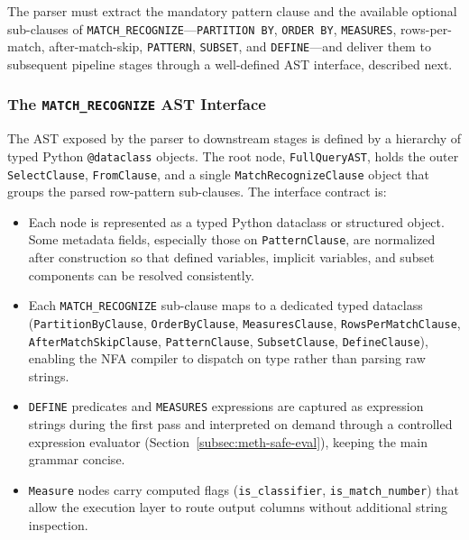 The parser must extract the mandatory pattern clause and the
available optional sub-clauses of
\texttt{MATCH\_RECOGNIZE}---\texttt{PARTITION~BY},
\texttt{ORDER~BY}, \texttt{MEASURES}, rows-per-match,
after-match-skip, \texttt{PATTERN}, \texttt{SUBSET}, and
\texttt{DEFINE}---and deliver them to subsequent pipeline stages
through a well-defined AST interface, described next.

\subsubsection{The \texttt{MATCH\_RECOGNIZE} AST Interface}
\label{subsubsec:meth-ast-interface}

The AST exposed by the parser to downstream stages is defined by a
hierarchy of typed Python \texttt{@dataclass} objects.  The root
node, \texttt{FullQueryAST}, holds the outer \texttt{SelectClause},
\texttt{FromClause}, and a single \texttt{MatchRecognizeClause}
object that groups the parsed row-pattern sub-clauses.  The interface
contract is:

\begin{itemize}
  \item Each node is represented as a typed Python dataclass or
    structured object.  Some metadata fields, especially those on
    \texttt{PatternClause}, are normalized after construction so that
    defined variables, implicit variables, and subset components can
    be resolved consistently.
  \item Each \texttt{MATCH\_RECOGNIZE} sub-clause maps to a
    dedicated typed dataclass
    (\texttt{PartitionByClause}, \texttt{OrderByClause},
     \texttt{MeasuresClause}, \texttt{RowsPerMatchClause},
     \texttt{AfterMatchSkipClause}, \texttt{PatternClause},
     \texttt{SubsetClause}, \texttt{DefineClause}),
    enabling the NFA compiler to dispatch on type rather than
    parsing raw strings.
  \item \texttt{DEFINE} predicates and \texttt{MEASURES}
    expressions are captured as expression strings during the first
    pass and interpreted on demand through a controlled expression
    evaluator (Section~\ref{subsec:meth-safe-eval}), keeping the main
    grammar concise.
  \item \texttt{Measure} nodes carry computed flags
    (\texttt{is\_classifier}, \texttt{is\_match\_number}) that
    allow the execution layer to route output columns without
    additional string inspection.
\end{itemize}

